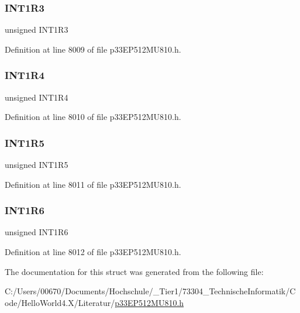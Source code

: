 \subsubsection{\texorpdfstring{I\+N\+T1\+R3}{INT1R3}}
{\footnotesize\ttfamily unsigned I\+N\+T1\+R3}



Definition at line 8009 of file p33\+E\+P512\+M\+U810.\+h.

\mbox{\label{structtag_r_p_i_n_r0_b_i_t_s_a4234a8551565ac915fadf2f447ba1072}} 
\subsubsection{\texorpdfstring{I\+N\+T1\+R4}{INT1R4}}
{\footnotesize\ttfamily unsigned I\+N\+T1\+R4}



Definition at line 8010 of file p33\+E\+P512\+M\+U810.\+h.

\mbox{\label{structtag_r_p_i_n_r0_b_i_t_s_ad492f57a2eb3397726044db795accb27}} 
\subsubsection{\texorpdfstring{I\+N\+T1\+R5}{INT1R5}}
{\footnotesize\ttfamily unsigned I\+N\+T1\+R5}



Definition at line 8011 of file p33\+E\+P512\+M\+U810.\+h.

\mbox{\label{structtag_r_p_i_n_r0_b_i_t_s_a80e119cffb6d38b53bc3fdf773aa9c16}} 
\subsubsection{\texorpdfstring{I\+N\+T1\+R6}{INT1R6}}
{\footnotesize\ttfamily unsigned I\+N\+T1\+R6}



Definition at line 8012 of file p33\+E\+P512\+M\+U810.\+h.



The documentation for this struct was generated from the following file\+:\begin{DoxyCompactItemize}
\item 
C\+:/\+Users/00670/\+Documents/\+Hochschule/\+\_\+\+Tier1/73304\+\_\+\+Technische\+Informatik/\+Code/\+Hello\+World4.\+X/\+Literatur/\hyperlink{p33_e_p512_m_u810_8h}{p33\+E\+P512\+M\+U810.\+h}\end{DoxyCompactItemize}
